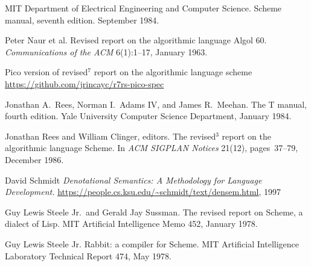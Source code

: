 \begin{thebibliography}{999}
MIT Department of Electrical Engineering and Computer Science.
Scheme manual, seventh edition.
September 1984.

Peter Naur et al.
Revised report on the algorithmic language Algol 60.
{\em Communications of the ACM} 6(1):1--17, January 1963.


 Pico version of revised$^7$ report on the algorithmic language scheme  \url{https://github.com/jrincayc/r7rs-pico-spec}


Jonathan A.~Rees, Norman I.~Adams IV, and James R.~Meehan.
The T manual, fourth edition.
Yale University Computer Science Department, January 1984.

Jonathan Rees and William Clinger, editors.
The revised$^3$ report on the algorithmic language Scheme.
In {\em ACM SIGPLAN Notices} 21(12), pages~37--79, December 1986.


  David Schmidt
  {\em Denotational Semantics: A Methodology for Language Development.}
  \url{https://people.cs.ksu.edu/~schmidt/text/densem.html}, 1997


Guy Lewis Steele Jr.~and Gerald Jay Sussman.
The revised report on Scheme, a dialect of Lisp.
MIT Artificial Intelligence Memo 452, January 1978.

Guy Lewis Steele Jr.
Rabbit: a compiler for Scheme.
MIT Artificial Intelligence Laboratory Technical Report 474, May 1978.


\end{thebibliography}
